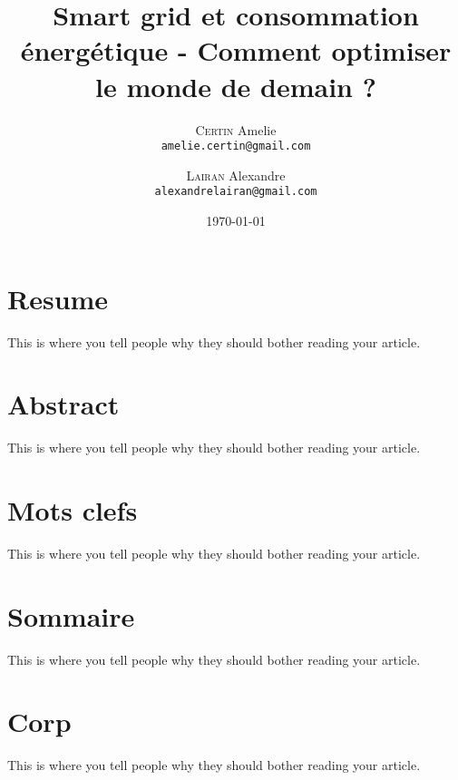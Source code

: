 \documentclass[11pt,french]{report}
\title{Smart grid et consommation énergétique - Comment optimiser le monde de demain ?}
\author{
  \textsc{Certin} Amelie\\
  \texttt{amelie.certin@gmail.com}
  \and
  \textsc{Lairan} Alexandre\\
  \texttt{alexandrelairan@gmail.com}
}
\date{\today}
\begin{document}
  \maketitle

  \section{Resume}
  This is where you tell people why they should bother reading your article.

  \section{Abstract}
  This is where you tell people why they should bother reading your article.

  \section{Mots clefs}
  This is where you tell people why they should bother reading your article.

  \section{Sommaire}
  This is where you tell people why they should bother reading your article.

  \section{Corp}
  This is where you tell people why they should bother reading your article.
\end{document}

